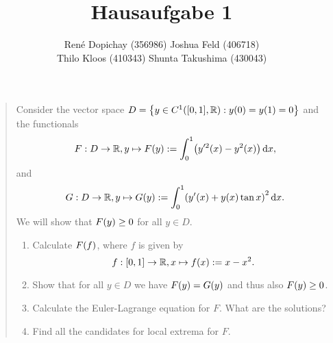 \documentclass{exercise}
\title{Hausaufgabe 1}
\author{René Dopichay (356986) \quad Joshua Feld (406718)\\Thilo Kloos (410343) \quad Shunta Takushima (430043)}
\begin{document}
	\maketitle


	\section{}

	\begin{quote}
		Consider the vector space \(D = \braces*{y \in C^1\parentheses*{\brackets*{0, 1}, \R} : y\parentheses*{0} = y\parentheses*{1} = 0}\) and the functionals
		\[
			F: D \to \R, y \mapsto F\parentheses*{y} := \int_0^1 \parentheses*{y'^2\parentheses*{x} - y^2\parentheses*{x}}\d x,
		\]
		and
		\[
			G: D \to \R, y \mapsto G\parentheses*{y} := \int_0^1 \parentheses*{y'\parentheses*{x} + y\parentheses*{x}\tan x}^2 \d x.
		\]
		We will show that \(F\parentheses*{y} \ge 0\) for all \(y \in D\).
		\begin{enumerate}
			\item Calculate \(F\parentheses*{f}\), where \(f\) is given by
			\[
				f: \brackets*{0, 1} \to \R, x \mapsto f\parentheses*{x} := x - x^2.
			\]
			\item Show that for all \(y \in D\) we have \(F\parentheses*{y} = G\parentheses*{y}\) and thus also \(F\parentheses*{y} \ge 0\).
			\item Calculate the Euler-Lagrange equation for \(F\).
			What are the solutions?
			\item Find all the candidates for local extrema for \(F\).
		\end{enumerate}
	\end{quote}
\end{document}
